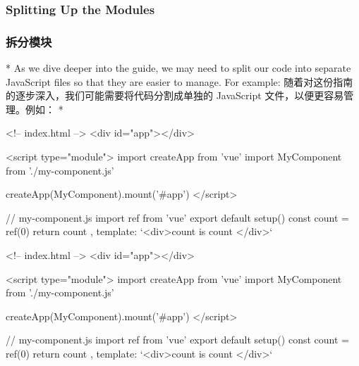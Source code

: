 \begin{paracol}{2}
\subsubsection{Splitting Up the Modules}
\switchcolumn
\subsubsection{拆分模块}
\switchcolumn[0]*%
As we dive deeper into the guide, we may need to split our code into
separate JavaScript files so that they are easier to manage. For
example:
\switchcolumn
随着对这份指南的逐步深入，我们可能需要将代码分割成单独的 JavaScript
文件，以便更容易管理。例如：
\switchcolumn[0]*%
\begin{codeHtml}
<!-- index.html -->
<div id="app"></div>

<script type="module">
    import { createApp } from 'vue'
    import MyComponent from './my-component.js'

    createApp(MyComponent).mount('#app')
</script>
\end{codeHtml}  

\begin{codeJs}
// my-component.js
import { ref } from 'vue'
export default {
    setup() {
    const count = ref(0)
    return { count }
    },
    template: `<div>count is {{ count }}</div>`
}
\end{codeJs}  
\switchcolumn
\begin{codeHtml}
<!-- index.html -->
<div id="app"></div>

<script type="module">
    import { createApp } from 'vue'
    import MyComponent from './my-component.js'

    createApp(MyComponent).mount('#app')
</script>
\end{codeHtml}  

\begin{codeJs}
// my-component.js
import { ref } from 'vue'
export default {
    setup() {
    const count = ref(0)
    return { count }
    },
    template: `<div>count is {{ count }}</div>`
}
\end{codeJs}  


\end{paracol}

